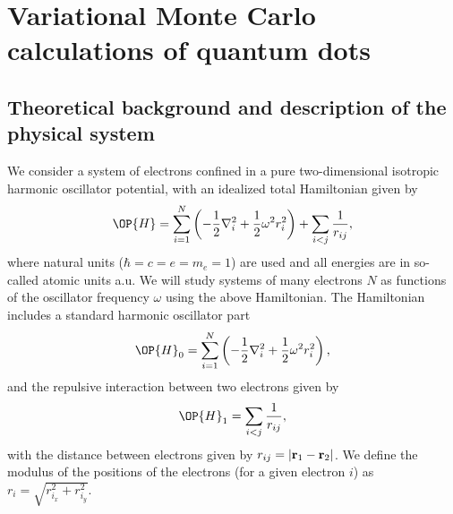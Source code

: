 \documentclass[10pt]{article}
\begin{document}
\section*{Variational Monte Carlo calculations of quantum dots}

\subsection*{Theoretical background and description of the physical system}


We consider a system of electrons confined in a pure two-dimensional 
isotropic harmonic oscillator potential, with an idealized  total Hamiltonian given by 
\begin{equation}
\label{eq:finalH}
\OP{H}=\sum_{i=1}^{N} \left(  -\frac{1}{2} \nabla_i^2 + \frac{1}{2} \omega^2r_i^2  \right)+\sum_{i<j}\frac{1}{r_{ij}},
\end{equation}
where natural units ($\hbar=c=e=m_e=1$) are used and all energies are in so-called atomic units a.u. We will study systems of many electrons $N$ as functions of the oscillator frequency  $\omega$ using the above Hamiltonian.  The Hamiltonian includes a standard harmonic oscillator part
\[
\OP{H}_0=\sum_{i=1}^{N} \left(  -\frac{1}{2} \nabla_i^2 + \frac{1}{2} \omega^2r_i^2  \right),
\]
and the repulsive interaction between two electrons given by 
\[
\OP{H}_1=\sum_{i<j}\frac{1}{r_{ij}},
\]
with the distance between electrons given by $r_{ij}=\vert {\bf r}_1-{\bf r}_2\vert$. We define the 
modulus of the positions of the electrons (for a given electron $i$) as $r_i = \sqrt{r_{i_x}^2+r_{i_y}^2}$.
\end{document}
